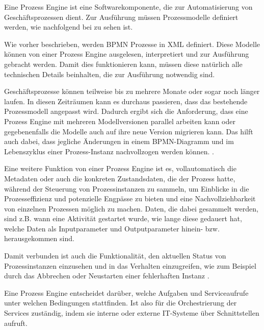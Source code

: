 Eine Prozess Engine ist eine Softwarekomponente, die zur Automatisierung von Geschäftsprozessen dient. Zur Ausführung müssen Prozessmodelle definiert werden, wie nachfolgend bei  zu sehen ist. \citep[vgl.][]{leymann_definition_2024}

Wie vorher beschrieben, werden \ac{BPMN} Prozesse in \ac{XML} definiert. Diese Modelle können von einer Prozess Engine ausgelesen, interpretiert und zur Ausführung gebracht werden. Damit dies funktionieren kann, müssen diese natürlich alle technischen Details beinhalten, die zur Ausführung notwendig sind. \citep[vgl.][S. 226]{freund_praxishandbuch_2017}

Geschäftsprozesse können teilweise bis zu mehrere Monate oder sogar noch länger laufen. In diesen Zeiträumen kann es durchaus passieren, dass das bestehende Prozessmodell angepasst wird. Dadurch ergibt sich die Anforderung, dass eine Prozess Engine mit mehreren Modellversionen parallel arbeiten kann oder gegebenenfalls die Modelle auch auf ihre neue Version migrieren kann. Das hilft auch dabei, dass jegliche Änderungen in einem \ac{BPMN}-Diagramm und im Lebenszyklus einer Prozess-Instanz nachvollzogen werden können. \citep[vgl.][S. 226]{freund_praxishandbuch_2017}.

Eine weitere Funktion von einer Prozess Engine ist es, vollautomatisch die Metadaten oder auch die konkreten Zustandsdaten, die der Prozess hatte, während der Steuerung von Prozessinstanzen zu sammeln, um Einblicke in die Prozesseffizienz und potenzielle Engpässe zu bieten und eine Nachvollziehbarkeit von einzelnen Prozessen möglich zu machen. Daten, die dabei gesammelt werden, sind z.B. wann eine Aktivität gestartet wurde, wie lange diese gedauert hat, welche Daten als Inputparameter und Outputparameter hinein- bzw. herausgekommen sind. \citep[vgl.][S. 7, 226]{freund_praxishandbuch_2017} \citep[vgl.][]{stiehl_prozessgesteuerte_2024} 

Damit verbunden ist auch die Funktionalität, den aktuellen Status von Prozessinstanzen einzusehen und in das Verhalten einzugreifen, wie zum Beispiel durch das Abbrechen oder Neustarten einer fehlerhaften Instanz \citep[vgl.][S.226]{freund_praxishandbuch_2017}.

Eine Prozess Engine entscheidet darüber, welche Aufgaben und Serviceaufrufe unter welchen Bedingungen stattfinden. Ist also für die Orchestrierung der Services zuständig, indem sie interne oder externe IT-Systeme über Schnittstellen aufruft. \citep[vgl.][S. 6]{freund_praxishandbuch_2017}

